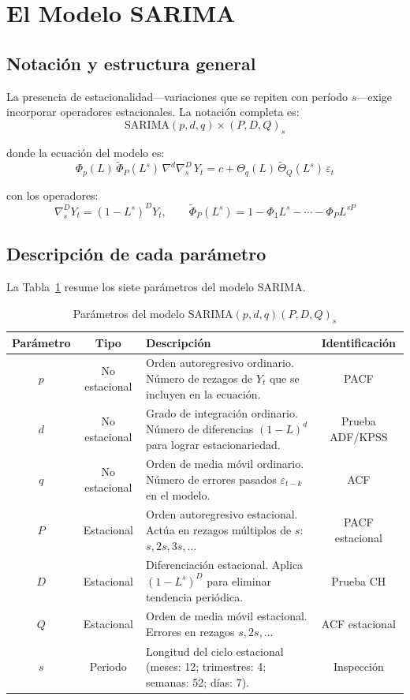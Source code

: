 \documentclass[12pt, a4paper]{article}
\begin{document}
\section{El Modelo SARIMA}

\subsection{Notación y estructura general}

La presencia de estacionalidad---variaciones que se repiten con período $s$---exige
incorporar operadores estacionales. La notación completa es:
\[
  \mathrm{SARIMA}(p,d,q)\times(P,D,Q)_s
\]

donde la ecuación del modelo es:
\[
  \Phi_p(L)\,\tilde{\Phi}_P(L^s)\,\nabla^d\nabla_s^D\,Y_t
  = c + \Theta_q(L)\,\tilde{\Theta}_Q(L^s)\,\varepsilon_t
\]

con los operadores:
\[
  \nabla_s^D Y_t = (1-L^s)^D Y_t, \qquad
  \tilde{\Phi}_P(L^s) = 1 - \Phi_1 L^s - \cdots - \Phi_P L^{sP}
\]

\subsection{Descripción de cada parámetro}

La Tabla~\ref{tab:params} resume los siete parámetros del modelo SARIMA.

\begin{table}[H]
  \centering
  \caption{Parámetros del modelo SARIMA$(p,d,q)(P,D,Q)_s$}
  \label{tab:params}
  \begin{tabular}{ccp{6.5cm}c}
    \toprule
    \textbf{Parámetro} & \textbf{Tipo} & \textbf{Descripción} & \textbf{Identificación} \\
    \midrule
    $p$ & No estacional & Orden autoregresivo ordinario. Número de rezagos de $Y_t$ que se incluyen en la ecuación. & PACF \\
    $d$ & No estacional & Grado de integración ordinario. Número de diferencias $(1-L)^d$ para lograr estacionariedad. & Prueba ADF/KPSS \\
    $q$ & No estacional & Orden de media móvil ordinario. Número de errores pasados $\varepsilon_{t-k}$ en el modelo. & ACF \\
    $P$ & Estacional & Orden autoregresivo estacional. Actúa en rezagos múltiplos de $s$: $s, 2s, 3s, \ldots$ & PACF estacional \\
    $D$ & Estacional & Diferenciación estacional. Aplica $(1-L^s)^D$ para eliminar tendencia periódica. & Prueba CH \\
    $Q$ & Estacional & Orden de media móvil estacional. Errores en rezagos $s, 2s, \ldots$ & ACF estacional \\
    $s$ & Periodo & Longitud del ciclo estacional (meses: 12; trimestres: 4; semanas: 52; días: 7). & Inspección \\
    \bottomrule
  \end{tabular}
\end{table}
\end{document}
